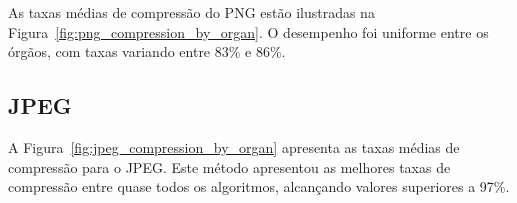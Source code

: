 As taxas médias de compressão do \acrshort{PNG} estão ilustradas na Figura~\ref{fig:png_compression_by_organ}. O desempenho foi uniforme entre os órgãos, com taxas variando entre 83\% e 86\%.

\begin{figure}[H]
	\centering
\end{figure}

\subsection{\acrshort{JPEG}}

A Figura~\ref{fig:jpeg_compression_by_organ} apresenta as taxas médias de compressão para o \acrshort{JPEG}. Este método apresentou as melhores taxas de compressão entre quase todos os algoritmos, alcançando valores superiores a 97\%.

\begin{figure}[H]
	\centering
\end{figure}

